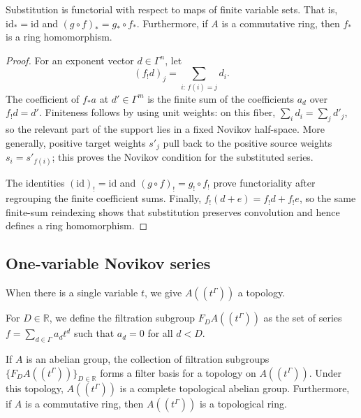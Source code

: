 \begin{theorem}
  \label{thm:novikov_substitute_functorial}
  \leanok
  Substitution is functorial with respect to maps of finite variable sets.
  That is, $\text{id}_*=\text{id}$ and $(g\circ f)_*=g_*\circ f_*$. Furthermore,
  if $A$ is a
  commutative ring, then $f_*$ is a ring homomorphism.
\end{theorem}

\begin{proof}
  \leanok
  For an exponent vector $d\in\Gamma^n$, let
  \[
    (f_{!}d)_j=\sum_{i:\,f(i)=j}d_i.
  \]
  The coefficient of $f_*a$ at $d'\in\Gamma^m$ is the finite sum of the
  coefficients $a_d$ over $f_{!}d=d'$.  Finiteness follows by using unit weights:
  on this fiber, $\sum_i d_i=\sum_jd'_j$, so the relevant part of the support
  lies in a fixed Novikov half-space.  More generally, positive target weights
  $s'_j$ pull back to the positive source weights $s_i=s'_{f(i)}$; this proves
  the Novikov condition for the substituted series.

  The identities $(\mathrm{id})_{!}=\mathrm{id}$ and
  $(g\circ f)_{!}=g_{!}\circ f_{!}$ prove functoriality after regrouping the
  finite coefficient sums.  Finally, $f_{!}(d+e)=f_{!}d+f_{!}e$, so the same finite-sum
  reindexing shows that substitution preserves convolution and hence defines
  a ring homomorphism.
\end{proof}

\subsection{One-variable Novikov series}

When there is a single variable $t$, we give $A((t^\Gamma))$ a topology.

\begin{definition}
  \label{def:novikov_filtration}
  \leanok
  For $D \in \mathbb{R}$, we define the filtration subgroup $F_D A((t^\Gamma))$
  as the set of series $f = \sum_{d \in \Gamma} a_d t^d$ such that $a_d = 0$ for
  all $d < D$.
\end{definition}

\begin{theorem}
  \label{thm:novikov_topology}
  \leanok
  If $A$ is an abelian group, the collection of filtration subgroups
  $\{F_D A((t^\Gamma))\}_{D \in \mathbb{R}}$ forms a filter basis for a topology
  on $A((t^\Gamma))$. Under this topology, $A((t^\Gamma))$ is a complete
  topological abelian group. Furthermore, if $A$ is a commutative ring, then
  $A((t^\Gamma))$ is a topological ring.
\end{theorem}

